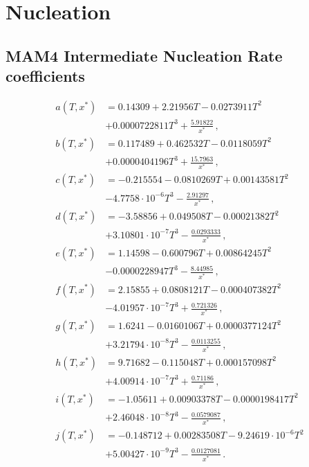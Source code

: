 
\section{Nucleation}

\subsection{MAM4 Intermediate Nucleation Rate coefficients}

\begin{align}
a(T,x^*) &= 0.14309 + 2.21956 T - 0.0273911 T^2 \nonumber \\
             &+ 0.0000722811 T^3 + \frac{5.91822}{x^*} \,, \\
b(T,x^*) &= 0.117489 + 0.462532 T - 0.0118059 T^2 \nonumber \\
             &+ 0.0000404196 T^3 + \frac{15.7963}{x^*} \,, \\
c(T,x^*) &= -0.215554 - 0.0810269 T + 0.00143581T^2 \nonumber \\
             &- 4.7758 \cdot 10^{-6} T^3 - \frac{2.91297}{x^*} \,, \\
d(T,x^*) &= -3.58856 + 0.049508 T - 0.00021382 T^2 \nonumber \\
             &+ 3.10801 \cdot 10^{-7} T^3 - \frac{0.0293333}{x^*} \,, \\
e(T,x^*) &= 1.14598 - 0.600796 T + 0.00864245 T^2 \nonumber \\
             &- 0.0000228947 T^3 - \frac{8.44985}{x^*} \,, \\
f(T,x^*) &= 2.15855 + 0.0808121 T - 0.000407382 T^2 \nonumber \\
             &- 4.01957 \cdot 10^{-7} T^3 + \frac{0.721326}{x^*} \,, \\
g(T,x^*) &= 1.6241 - 0.0160106 T + 0.0000377124 T^2 \nonumber \\
             &+ 3.21794 \cdot 10^{-8} T^3 - \frac{0.0113255}{x^*} \,, \\
h(T,x^*) &= 9.71682 - 0.115048 T + 0.000157098 T^2 \nonumber \\
             &+ 4.00914 \cdot 10^{-7} T^3 + \frac{0.71186}{x^*} \,, \\
i(T,x^*) &= -1.05611 + 0.00903378 T - 0.0000198417 T^2 \nonumber \\
            &+ 2.46048 \cdot 10^{-8} T^3 - \frac{0.0579087}{x^*} \,, \\
j(T,x^*) &= -0.148712 + 0.00283508 T - 9.24619 \cdot 10^{-6} T^2 \nonumber \\
            &+ 5.00427 \cdot 10^{-9} T^3 - \frac{0.0127081}{x^*} \,.
\end{align}


